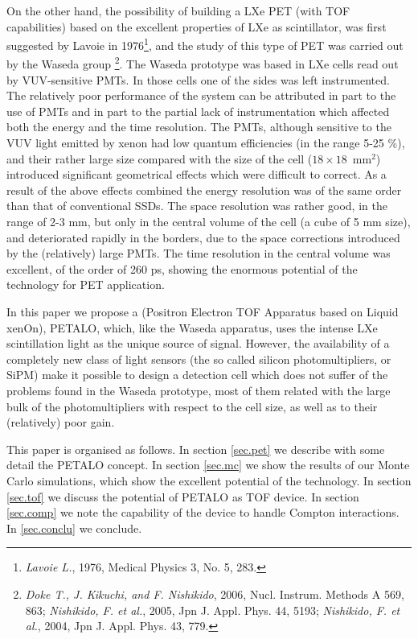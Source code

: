 \documentclass{JINST}
\begin{document}
On the other hand, the possibility of building a LXe PET (with TOF capabilities) based on the excellent properties of LXe as scintillator, was first suggested by Lavoie in 1976\footnote{{\em Lavoie L.}, 1976, Medical Physics 3, No. 5, 283.}, and the study of this type of PET was carried out by the Waseda group \footnote{{\em Doke T., J. Kikuchi, and F. Nishikido}, 2006, 
Nucl. Instrum. Methods A 569, 863;  {\em Nishikido, F. et al.}, 2005, Jpn J. Appl. Phys. 44, 5193; {\em Nishikido, F. et al.}, 2004, Jpn J. Appl. Phys. 43, 779.}. The Waseda prototype was based in LXe cells read out by VUV-sensitive PMTs. In those cells one of the sides was left instrumented. The relatively poor performance of the system can be attributed in part to the use of PMTs and in part to the partial lack of instrumentation which affected both the energy and the time resolution. The PMTs, although sensitive to the VUV light emitted by xenon had low quantum efficiencies (in the range 5-25 \%), and their rather large size compared with the size of the cell ($18\times 18$~mm$^2$) introduced significant geometrical effects which were difficult to correct. As a result of the above effects combined the energy resolution was of the same order than that of conventional SSDs. The space resolution was rather good, in the range of 2-3 mm, but only in the central volume of the cell (a cube of 5 mm size), and deteriorated rapidly in the borders, due to the space corrections introduced by the (relatively) large PMTs. The time resolution in the central volume was excellent, of the order of 260 ps, showing the enormous potential of the technology for PET application. 

In this paper we propose a (Positron Electron TOF Apparatus based on Liquid xenOn), PETALO, which, like the Waseda apparatus, uses the intense LXe scintillation light as the unique source of signal. However, the availability of a completely new class of light sensors (the so called silicon photomultipliers, or SiPM) make it possible to design a detection cell which does not suffer of the problems found in the Waseda prototype, most of them related with the large bulk of the photomultipliers with respect to the cell size, as well as to their (relatively) poor gain. 

This paper is organised as follows. In section \ref{sec.pet} we describe with some detail the PETALO concept. In section \ref{sec.mc} we show the results of our Monte Carlo simulations, which show the excellent potential of the technology. In section \ref{sec.tof} we discuss the potential of PETALO as TOF device. In section \ref{sec.comp} we note the capability of the device to handle Compton interactions. In \ref{sec.conclu} we conclude. 
\end{document}
